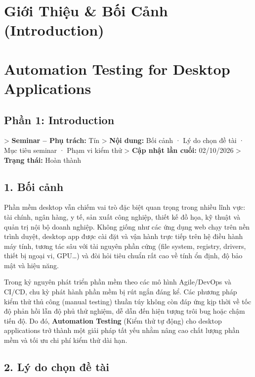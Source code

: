 \section{Giới Thiệu & Bối Cảnh (Introduction)}

\section{Automation Testing for Desktop Applications}
\subsection{Phần 1: Introduction}

> \textbf{Seminar – Phụ trách:} Tín  
> \textbf{Nội dung:} Bối cảnh · Lý do chọn đề tài · Mục tiêu seminar · Phạm vi kiểm thử  
> \textbf{Cập nhật lần cuối:} 02/10/2026  
> \textbf{Trạng thái:} Hoàn thành  


\subsection{1. Bối cảnh}

Phần mềm desktop vẫn chiếm vai trò đặc biệt quan trọng trong nhiều lĩnh vực: tài chính, ngân hàng, y tế, sản xuất công nghiệp, thiết kế đồ họa, kỹ thuật và quản trị nội bộ doanh nghiệp. Không giống như các ứng dụng web chạy trên nền trình duyệt, desktop app được cài đặt và vận hành trực tiếp trên hệ điều hành máy tính, tương tác sâu với tài nguyên phần cứng (file system, registry, drivers, thiết bị ngoại vi, GPU…) và đòi hỏi tiêu chuẩn rất cao về tính ổn định, độ bảo mật và hiệu năng.

Trong kỷ nguyên phát triển phần mềm theo các mô hình Agile/DevOps và CI/CD, chu kỳ phát hành phần mềm bị rút ngắn đáng kể. Các phương pháp kiểm thử thủ công (manual testing) thuần túy không còn đáp ứng kịp thời về tốc độ phản hồi lẫn độ phủ thử nghiệm, dễ dẫn đến hiện tượng trôi bug hoặc chậm tiến độ. Do đó, \textbf{Automation Testing} (Kiểm thử tự động) cho desktop applications trở thành một giải pháp tất yếu nhằm nâng cao chất lượng phần mềm và tối ưu chi phí kiểm thử dài hạn.


\subsection{2. Lý do chọn đề tài}

